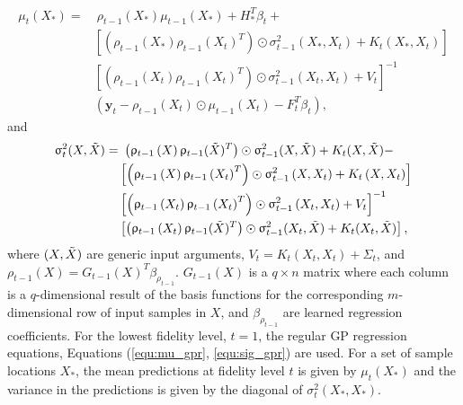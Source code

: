 \begin{equation}\label{equ:mu_Zt}
\begin{split}
    \mu_{t}(X_*) = & ~ \rho_{t-1} \left ( X_* \right ) \mu_{t-1} \left (X_* \right ) + H_*^T\beta_t + \\
    & \left [ \left ( \rho_{t-1} \left (X_* \right ) \rho_{t-1} \left (X_t \right )^T \right ) \odot \sigma^2_{t-1} \left(X_*,X_t \right) + K_{t} \left(X_*,X_t \right)\right] \\ 
    & \left [ \left ( \rho_{t-1} \left (X_t \right ) \rho_{t-1} \left (X_t \right )^T \right ) \odot \sigma^2_{t-1} \left(X_t,X_t \right) + V_t \right ]^{-1} \\ 
    & \left (\mathbf{y}_t - \rho_{t-1} \left (X_t \right ) \odot \mu_{t-1} \left (X_t \right) - F_t^T \beta_t \right),
\end{split}
\end{equation}
and
\begin{equation}\label{equ:sig_Zt}
\begin{split}
    \sigma^2_{t}(X, \Tilde{X}) = & ~ \left (\rho_{t-1} \left ( X \right ) \rho_{t-1} ( \Tilde{X})^T \right ) \odot \sigma^2_{t-1} (X, \Tilde{X}) + K_t(X, \Tilde{X}) - \\
    & \left [ \left ( \rho_{t-1} \left (X \right ) \rho_{t-1} \left (X_t \right )^T \right ) \odot \sigma^2_{t-1} \left(X,X_t \right) + K_{t} \left(X,X_t \right)\right] \\ 
    & \left [ \left ( \rho_{t-1} \left (X_t \right ) \rho_{t-1} \left (X_t \right )^T \right ) \odot \sigma^2_{t-1} \left(X_t,X_t \right) + V_t \right ]^{-1} \\ 
    & \left [ \left ( \rho_{t-1} \left (X_t \right ) \rho_{t-1} ( \Tilde{X} )^T \right ) \odot \sigma^2_{t-1} (X_t, \Tilde{X} ) + K_{t} ( X_t, \Tilde{X} ) \right], 
\end{split}
\end{equation}
where $(X, \Tilde{X})$ are generic input arguments, $V_t = K_{t} \left(X_t,X_t \right) + \Sigma_t $, and $\rho_{t-1} (X) = G_{t-1}(X)^T \beta_{\rho_{t-1}}$. $G_{t-1}(X)$ is a $q \times n$ matrix where each column is a $q$-dimensional result of the basis functions for the corresponding $m$-dimensional row of input samples in $X$, and $\beta_{\rho_{t-1}}$ are learned regression coefficients. For the lowest fidelity level, $t=1$, the regular GP regression equations, Equations (\ref{equ:mu_gpr}, \ref{equ:sig_gpr}) are used. For a set of sample locations $X_*$, the mean predictions at fidelity level $t$ is given by $\mu_t(X_*)$ and the variance in the predictions is given by the diagonal of $\sigma^2_t(X_*,X_*)$. 

